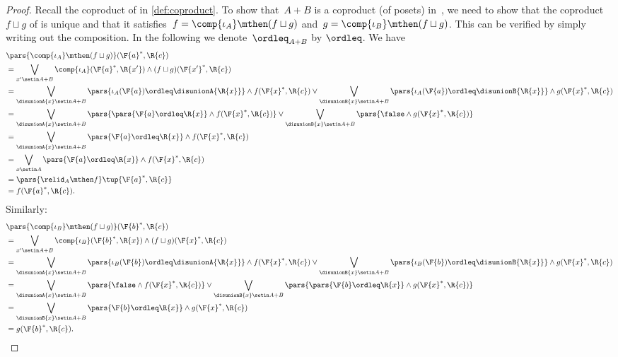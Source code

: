 \begin{proof}
    Recall the coproduct of  in \cref{def:coproduct}.
    To show that~$A+B$ is a coproduct (of posets) in~\DP, we need to show that the coproduct~$f \sqcup g$ of  is unique and that it satisfies~$f = \comp{\iota_A} \mthen (f \sqcup g)$ and~$g = \comp{\iota_B} \mthen (f \sqcup g)$.
    This can be verified by simply writing out the composition.
    In the following we denote~$\ordleq_{A+B}$ by $\ordleq$.
    We have
    \begin{equation}
        \begin{aligned}
             & \pars{\comp{\iota_A}\mthen (f\sqcup g)}(\F{a}^*,\R{c}) \\&=\bigvee_{x' \setin A+B}\comp{\iota_A}(\F{a}^*,\R{x'})\wedge (f\sqcup g)(\F{x'}^*,\R{c})\\
             & =\bigvee_{\disunionA{x} \setin A+B}
            \pars{\iota_A(\F{a})\ordleq\disunionA{\R{x}}}\wedge  f(\F{x}^*,\R{c})  \vee \bigvee_{\disunionB{x} \setin A+B}
            \pars{\iota_A(\F{a})\ordleq \disunionB{\R{x}}}\wedge  g(\F{x}^*,\R{c}) \\
             & =\bigvee_{\disunionA{x} \setin A+B}
            \pars{ \pars{\F{a}\ordleq \R{x}} \wedge  f(\F{x}^*,\R{c})} \vee \bigvee_{\disunionB{x} \setin A+B}
            \pars{ \false \wedge  g(\F{x}^*,\R{c}) } \\
             & =\bigvee_{\disunionA{x} \setin A+B} \pars{\F{a}\ordleq \R{x}} \wedge  f(\F{x}^*,\R{c}) \\
             & =\bigvee_{x\setin A}\pars{ \F{a}\ordleq \R{x}} \wedge f(\F{x}^*,\R{c}) \\
             & =\pars{ \relid_A \mthen f}\tup{\F{a}^*,\R{c}} \\
             & =f(\F{a}^*,\R{c}).
        \end{aligned}
    \end{equation}
    Similarly:
    \begin{equation}
        \begin{aligned}
             & \pars{\comp{\iota_B}\mthen (f\sqcup g)}(\F{b}^*,\R{c}) \\&=\bigvee_{x' \setin A+B}\comp{\iota_B}(\F{b}^*,\R{x})\wedge (f\sqcup g)(\F{x}^*,\R{c})\\
             & =\bigvee_{\disunionA{x} \setin A+B}
            \pars{\iota_B(\F{b})\ordleq\disunionA{\R{x}}}\wedge  f(\F{x}^*,\R{c})  \vee \bigvee_{\disunionB{x} \setin A+B}
            \pars{\iota_B(\F{b})\ordleq \disunionB{\R{x}}}\wedge  g(\F{x}^*,\R{c}) \\
             & =\bigvee_{\disunionA{x} \setin A+B}
            \pars{\false \wedge  f(\F{x}^*,\R{c})} \vee \bigvee_{\disunionB{x} \setin A+B}
            \pars{\pars{\F{b}\ordleq \R{x}} \wedge  g(\F{x}^*,\R{c}) } \\
             & =\bigvee_{\disunionB{x} \setin A+B} \pars{\F{b}\ordleq \R{x}} \wedge  g(\F{x}^*,\R{c}) \\
             & =g(\F{b}^*,\R{c}).
        \end{aligned}
    \end{equation}


\end{proof}
